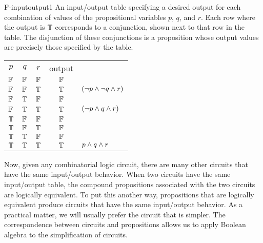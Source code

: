 \fig
   {F-inputoutput1}
   {An input/output table specifying a desired output for each
    combination of values of the propositional variables $p$,
    $q$, and $r$.  Each row where the output is $\mathbb{T}$ corresponds to
    a conjunction, shown next to that row in the table.  The
    disjunction of these conjunctions is a proposition whose
    output values are precisely those specified by the table.}
   {\begin{tabular}{|c|c|c||c|l}
       \cline{1-4}
       \strut $p$&  $q$&  $r$& output& \\
       \cline{1-4}
       \strut $\mathbb{F}$& $\mathbb{F}$& $\mathbb{F}$& $\mathbb{F}$& \\
       \cline{1-4}
       \strut $\mathbb{F}$& $\mathbb{F}$& $\mathbb{T}$& $\mathbb{T}$& $(\lnot p\wedge\lnot q\wedge r)$\\
       \cline{1-4}
       \strut $\mathbb{F}$& $\mathbb{T}$& $\mathbb{F}$& $\mathbb{F}$& \\
       \cline{1-4}
       \strut $\mathbb{F}$& $\mathbb{T}$& $\mathbb{T}$& $\mathbb{T}$& $(\lnot p\wedge q\wedge r)$\\
       \cline{1-4}
       \strut $\mathbb{T}$& $\mathbb{F}$& $\mathbb{F}$& $\mathbb{F}$& \\
       \cline{1-4}
       \strut $\mathbb{T}$& $\mathbb{F}$& $\mathbb{T}$& $\mathbb{F}$& \\
       \cline{1-4}
       \strut $\mathbb{T}$& $\mathbb{T}$& $\mathbb{F}$& $\mathbb{F}$& \\
       \cline{1-4}
       \strut $\mathbb{T}$& $\mathbb{T}$& $\mathbb{T}$& $\mathbb{T}$& $p\wedge q\wedge r$\\
       \cline{1-4}
    \end{tabular}
   }
   
\medbreak

Now, given any combinatorial logic circuit, there are many
other circuits that have the same input/output behavior. 
When two circuits have the same input/output table,
the compound propositions associated with
the two circuits are logically equivalent.  To put this another
way, propositions that are logically equivalent produce circuits
that have the same input/output behavior.  As a practical matter,
we will usually prefer the circuit that is simpler.  The
correspondence between circuits and propositions allows us
to apply Boolean algebra
to the simplification of circuits.

